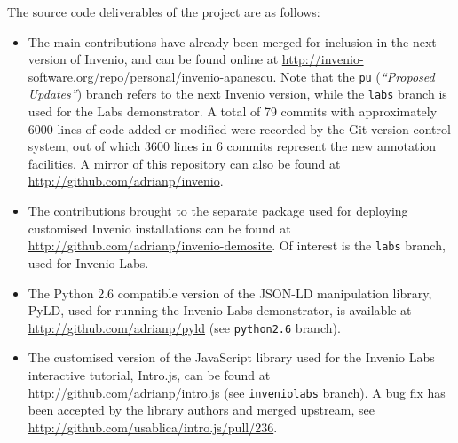 
The source code deliverables of the project are as follows:
\begin{itemize}
  \item The main contributions have already been merged for inclusion in the
    next version of Invenio, and can be found online at
    \url{http://invenio-software.org/repo/personal/invenio-apanescu}. Note that
    the \texttt{pu} (\textit{``Proposed Updates''}) branch refers to the next
    Invenio version, while the \texttt{labs} branch is used for the
    Labs demonstrator. A total of 79 commits with approximately 6000 lines of
    code added or modified  were recorded by the Git version control system,
    out of which 3600 lines in 6 commits represent the new annotation
    facilities. A mirror of this repository can also be found at
    \url{http://github.com/adrianp/invenio}.
  \item The contributions brought to the separate package used for deploying
    customised Invenio installations can be found at
    \url{http://github.com/adrianp/invenio-demosite}. Of interest is the
    \texttt{labs} branch, used for Invenio Labs.
  \item The Python 2.6 compatible version of the JSON-LD manipulation library,
    PyLD, used for running the Invenio Labs demonstrator, is available at
    \url{http://github.com/adrianp/pyld} (see \texttt{python2.6} branch).
  \item The customised version of the JavaScript library used for the Invenio
    Labs interactive tutorial, Intro.js, can be found at
    \url{http://github.com/adrianp/intro.js} (see \texttt{inveniolabs} branch).
    A bug fix has been accepted by the library authors and merged upstream, see
    \url{http://github.com/usablica/intro.js/pull/236}.
\end{itemize}

